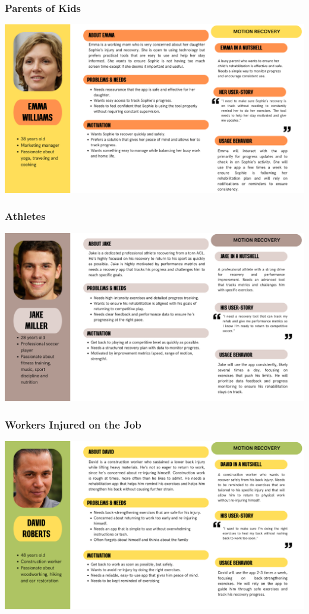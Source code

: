     \subsubsection{Parents of Kids}
    \includegraphics[width=\textwidth]{images/personas/patient_parent.png}
    \subsubsection{Athletes}
    \includegraphics[width=\textwidth]{images/personas/patient_athlete.png}
    \subsubsection{Workers Injured on the Job}
    \includegraphics[width=\textwidth]{images/personas/patient_worker_injured.png}
